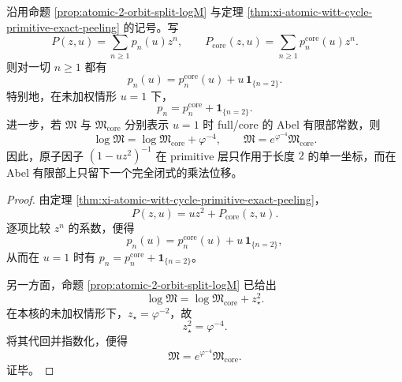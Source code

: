 \begin{theorem}\label{thm:xi-time-part65-atomic-primitive-abel-shift}
沿用命题 \ref{prop:atomic-2-orbit-split-logM} 与定理
\ref{thm:xi-atomic-witt-cycle-primitive-exact-peeling} 的记号。写
\[
P(z,u)=\sum_{n\ge 1}p_n(u)z^n,
\qquad
P_{\mathrm{core}}(z,u)=\sum_{n\ge 1}p_n^{\mathrm{core}}(u)z^n.
\]
则对一切 \(n\ge 1\) 都有
\[
\boxed{\;
p_n(u)=p_n^{\mathrm{core}}(u)+u\,\mathbf 1_{\{n=2\}}.\;}
\]
特别地，在未加权情形 \(u=1\) 下，
\[
\boxed{\;
p_n=p_n^{\mathrm{core}}+\mathbf 1_{\{n=2\}}.\;}
\]
进一步，若 \(\mathfrak M\) 与 \(\mathfrak M_{\mathrm{core}}\) 分别表示 \(u=1\) 时 full/core 的 Abel 有限部常数，则
\[
\boxed{\;
\log\mathfrak M
=
\log\mathfrak M_{\mathrm{core}}+\varphi^{-4},\qquad
\mathfrak M=e^{\varphi^{-4}}\mathfrak M_{\mathrm{core}}.\;}
\]
因此，原子因子 \((1-uz^2)^{-1}\) 在 primitive 层只作用于长度 \(2\) 的单一坐标，而在 Abel 有限部上只留下一个完全闭式的乘法位移。
\end{theorem}
\begin{proof}
由定理 \ref{thm:xi-atomic-witt-cycle-primitive-exact-peeling}，
\[
P(z,u)=u z^2+P_{\mathrm{core}}(z,u).
\]
逐项比较 \(z^n\) 的系数，便得
\[
p_n(u)=p_n^{\mathrm{core}}(u)+u\,\mathbf 1_{\{n=2\}},
\]
从而在 \(u=1\) 时有
\(
p_n=p_n^{\mathrm{core}}+\mathbf 1_{\{n=2\}}
\)。

另一方面，命题 \ref{prop:atomic-2-orbit-split-logM} 已给出
\[
\log\mathfrak M=\log\mathfrak M_{\mathrm{core}}+z_\star^2.
\]
在本核的未加权情形下，\(z_\star=\varphi^{-2}\)，故
\[
z_\star^2=\varphi^{-4}.
\]
将其代回并指数化，便得
\[
\mathfrak M=e^{\varphi^{-4}}\mathfrak M_{\mathrm{core}}.
\]
证毕。
\end{proof}


